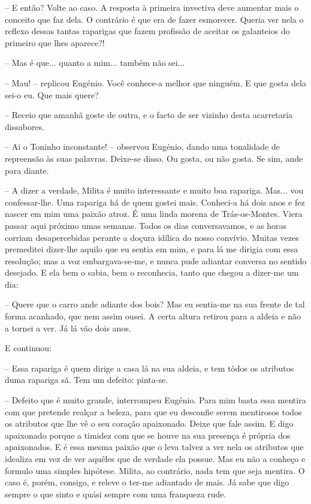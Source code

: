 \documentclass[9pt]{article}
\begin{document}
-- E então? Volte ao caso. A resposta à primeira invectiva deve aumentar
mais o conceito que faz dela. O contrário é que era de fazer esmorecer. Queria ver nela o reflexo dessas tantas raparigas que fazem profissão de aceitar os galanteios do primeiro que lhes aparece?!

-- Mas é que... quanto a mim... também não sei...

-- Mau! -- replicou Eugé\-nio. Você conhece-a me\-lhor que nin\-guém. E que gosta
dela sei-o eu. Que mais quere?

-- Receio que a\-ma\-nhã goste de outra, e o facto de ser vizinho desta acarretaria dissabores.

-- Ai o Toninho inconstante! -- observou Eugé\-nio, dando uma tonalidade de
repreensão às suas palavras. Deixe-se disso. Ou gosta, ou não gosta. Se
sim, ande para diante.

-- A dizer a verdade, Milita é muito interessante e muito boa rapariga.
Mas... vou confessar-\-lhe. Uma rapariga há de quem gostei mais. Conheci-a há
dois anos e fez nascer em mim uma paixão atroz. É uma linda morena de
Trás-os-Montes. Viera passar aqui próximo umas semanas. Todos os dias conversavamos, e as horas corriam desapercebidas perante a doçura idílica do
nosso con\-ví\-vio. Muitas vezes premeditei dizer-\-lhe aquilo que eu sentia em
mim, e para lá me dirigia com essa resolu\-ção; mas a voz embargava-se-me, e
nunca pude adiantar conversa no sentido desejado. E ela bem o sabia, bem o
reconhecia, tanto que chegou a dizer-me um dia:

-- Quere que o carro ande adiante dos bois? Mas eu sentia-me
na sua frente de tal forma acanhado, que nem assim ousei. A certa altura
retirou para a aldeia e não a tornei a ver. Já lá vão dois anos.

E continuou:

-- Essa rapariga é quem dirige a casa lá na sua aldeia, e tem tôdos os
atributos duma rapariga sã. Tem um defeito: pinta-se.

-- Defeito que é muito gran\-de, interrompeu Eugé\-nio. Para mim basta essa mentira com que pretende realçar a beleza, para que eu desconfie serem
mentirosos todos os atributos que lhe vê o seu cora\-ção apaixonado. Deixe
que fale assim. E digo apaixonado porque a timidez com que se houve na sua
presença é própria dos apaixonados. E é essa mesma paixão que o leva talvez
a ver nela os atributos que idealiza em vez de ver a\-quê\-les que de verdade
ela possue. Mas eu não a conheço e formulo uma simples hipótese. Milita, ao
contrário, nada tem que seja mentira. O caso é, porém, consigo, e releve o
ter-me adiantado de mais. Já sabe que digo sempre o que sinto e quási sempre com uma franqueza rude.
\end{document}
